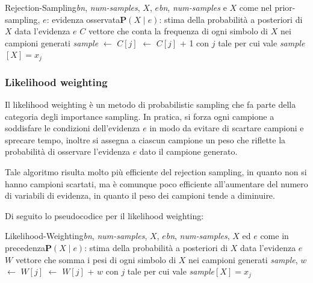 \begin{algo}{Rejection-Sampling}{\textit{bn}, \textit{num-samples}, $X$, $e$}{\textit{bn}, \textit{num-samples} e $X$ come nel prior-sampling, $e$: evidenza osservata}{$\textbf{P}(X \mid e)$: stima della probabilità a posteriori di \(X\) data l'evidenza \(e\)}
	\State $C$ vettore che conta la frequenza di ogni simbolo di $X$ nei campioni generati 
		\State \textit{sample} $\leftarrow$ 
			\State $C[j]$ $\leftarrow$ $C[j]$ + 1 con $j$ tale per cui vale \textit{sample}$[X] = x_j$
		\EndIf
	\EndFor
	\State \Return {} 
\end{algo}

\newpage

\subsubsection*{Likelihood weighting}
Il likelihood weighting è un metodo di probabilistic sampling che fa parte della categoria degli importance sampling.
In pratica, si forza ogni campione a soddisfare le condizioni dell'evidenza \(e\) in modo da evitare di scartare campioni
e sprecare tempo, inoltre si assegna a ciascun campione un peso che riflette la probabilità di osservare l'evidenza \(e\)
dato il campione generato.

Tale algoritmo risulta molto più efficiente del rejection sampling, in quanto non si hanno campioni scartati, ma è comunque
poco efficiente all'aumentare del numero di variabili di evidenza, in quanto il peso dei campioni tende a diminuire.

Di seguito lo pseudocodice per il likelihood weighting:

\begin{algo}{Likelihood-Weighting}{\textit{bn}, \textit{num-samples}, $X$, $e$}{\textit{bn}, \textit{num-samples}, $X$ ed $e$ come in precedenza}{$\textbf{P}(X \mid e)$: stima della probabilità a posteriori di \(X\) data l'evidenza \(e\)}
	\State $W$ vettore che somma i pesi di ogni simbolo di $X$ nei campioni generati 
		\State \textit{sample}, $w$ $\leftarrow$ 
		\State $W[j]$ $\leftarrow$ $W[j]$ + $w$ con $j$ tale per cui vale \textit{sample}$[X] = x_j$
	\EndFor
	\State \Return {} 
\end{algo}

